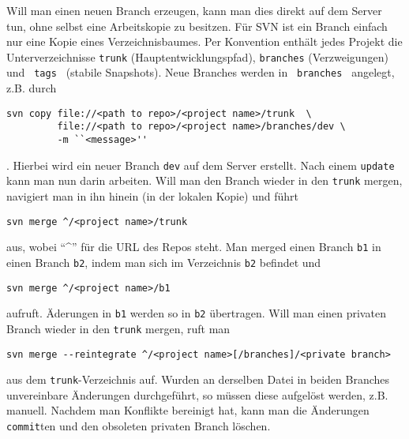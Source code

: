 \documentclass{scrartcl}
\begin{document}
Will man einen neuen Branch erzeugen, kann man dies direkt auf dem Server tun,
ohne selbst eine Arbeitskopie zu besitzen. Für SVN ist ein Branch einfach nur
eine Kopie eines Verzeichnisbaumes. Per Konvention enthält jedes Projekt die
Unterverzeichnisse \texttt{trunk} (Hauptentwicklungspfad), \texttt{branches}
(Verzweigungen) und \texttt{ tags } (stabile Snapshots). Neue Branches werden in
\texttt{ branches } angelegt, z.B. durch 
\begin{lstlisting}
svn copy file://<path to repo>/<project name>/trunk  \
         file://<path to repo>/<project name>/branches/dev \
         -m ``<message>''
\end{lstlisting} . Hierbei wird ein neuer Branch 
\texttt{dev} auf dem Server erstellt. Nach einem \texttt{update} kann man nun
darin arbeiten. Will man den Branch wieder in den \texttt{trunk} mergen,
navigiert man in ihn hinein (in der lokalen Kopie) und führt
\begin{lstlisting}
svn merge ^/<project name>/trunk
\end{lstlisting} aus, wobei ``\^{}'' für die URL des Repos steht. 
Man merged einen Branch \texttt{b1} in einen Branch \texttt{b2}, indem man sich
im Verzeichnis \texttt{b2} befindet und 
\begin{lstlisting}
svn merge ^/<project name>/b1
\end{lstlisting}
aufruft. Äderungen in \texttt{b1} werden so in \texttt{b2} übertragen. Will man
einen privaten Branch wieder in den \texttt{trunk} mergen, ruft man
\begin{lstlisting}
svn merge --reintegrate ^/<project name>[/branches]/<private branch>
\end{lstlisting} aus dem \texttt{trunk}-Verzeichnis auf.
Wurden an derselben Datei in beiden Branches unvereinbare Änderungen
durchgeführt, so müssen diese aufgelöst werden, z.B. manuell. Nachdem man
Konflikte bereinigt hat, kann man die Änderungen \texttt{commit}ten und den
obsoleten privaten Branch löschen.
\end{document}
